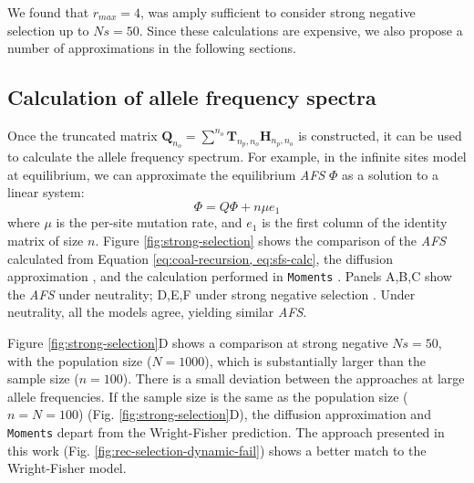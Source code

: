 \documentclass[review]{elsarticle}
\newcommand{\sgcomment}[1]{{\color{red}{SG: #1}}}
\begin{document}
We found that $r_{max}=4$, was amply 
sufficient to consider strong negative selection up to $Ns=50$. Since these calculations are
expensive, we also propose a number of approximations in the following sections. \sgcomment{Check: do we?}

\subsection{Calculation of allele frequency spectra}
\label{subsec:afs}

Once the truncated matrix
$\mathbf{Q}_{n_o} = \sum^{n_{o}} \mathbf{T}_{n_p,n_o} \mathbf{H}_{n_p,n_o}$ is constructed, it can
be used to calculate the allele frequency spectrum. For example, in the infinite sites model at
equilibrium, we can approximate the equilibrium \textit{AFS} $\Phi$ as a solution to a linear
system:
\begin{equation}
  \label{eq:sfs-calc}
  \Phi = Q \Phi  + n \mu e_1
\end{equation}
where $\mu$ is the per-site mutation rate, and $e_1$ is the first column of the identity matrix of
size $n$. Figure \ref{fig:strong-selection} shows the comparison of the \textit{AFS} calculated from
Equation \eqref{eq:coal-recursion, eq:sfs-calc}, the diffusion approximation \cite[eq.
9.23]{Ewens2004}, and the calculation performed in \texttt{Moments} \citep{JouganousEtAl2017}.
Panels A,B,C show the \textit{AFS} under neutrality; D,E,F under strong negative selection \sgcomment{This would be in the caption, no?}. Under
neutrality, all the models agree, yielding similar \textit{AFS}. \sgcomment{That is not my interpretation...}

Figure \ref{fig:strong-selection}D shows a comparison at strong negative $Ns=50$, with the
population size ($N=1000$), which is substantially larger than the sample size ($n=100$). There is a
small deviation between the approaches at large allele frequencies. If the sample size is the same
as the population size ($n=N=100$) (Fig. \ref{fig:strong-selection}D), the diffusion approximation
and \texttt{Moments} depart from the Wright-Fisher prediction. The approach presented in this work
(Fig. \ref{fig:rec-selection-dynamic-fail}) shows a better match to the Wright-Fisher model.
\end{document}
